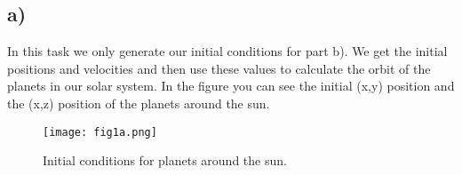\subsection{a)}
In this task we only generate our initial conditions for part b). We get the initial positions and velocities and then use these values to calculate the orbit of the planets in our solar system.
In the figure you can see the initial (x,y) position and the (x,z) position of the planets around the sun. 

\begin{figure}[h!]
    \centering
    \texttt{[image: fig1a.png]}
    \caption{Initial conditions for planets around the sun.}
\end{figure}



